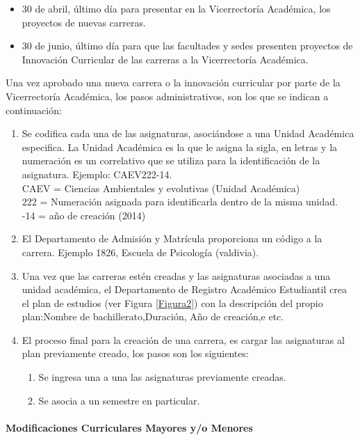 \documentclass[12pt]{article}
\newcommand{\myparagraph}[1]{\paragraph{#1}\mbox{}\\}
\begin{document}
			\begin{itemize}
				\item 30 de abril, último día para presentar en la Vicerrectoría Académica, los proyectos de nuevas carreras.
				\item 30 de junio, último día para que las facultades y sedes presenten proyectos de Innovación Curricular de las carreras a la Vicerrectoría Académica.
			\end{itemize}
			
			
			Una vez aprobado una nueva carrera o la innovación curricular por parte de la Vicerrectoría Académica, los pasos administrativos, son los que se indican a continuación:
		
			
			
			
			\begin{enumerate}
				
				
				\item Se codifica cada una de las asignaturas, asociándose a una Unidad Académica especifica. La Unidad Académica es la que le asigna la sigla, en letras y la numeración es un correlativo que se utiliza para la identificación de la asignatura. Ejemplo: CAEV222-14.
				\\
				CAEV = Ciencias Ambientales y evolutivas (Unidad Académica)
				\\
				222   = Numeración asignada para identificarla dentro de la misma unidad.
				\\
				-14    = año de creación (2014)
				
				\item El Departamento de Admisión y Matrícula proporciona  un código a la carrera. Ejemplo 1826, Escuela de Psicología (valdivia).
				
				\item Una vez que las carreras estén creadas y las asignaturas asociadas a una unidad académica, el Departamento de Registro Académico Estudiantil crea el plan de estudios (ver Figura \ref{Figura2}) con la descripción del propio plan:Nombre de bachillerato,Duración, Año de creación,e etc.
				
				\item El proceso final para la creación de una carrera, es cargar  las asignaturas al plan previamente creado, los pasos son los siguientes:
				\begin{enumerate}
					\item Se ingresa una a una las asignaturas previamente creadas.
					\item Se asocia a un semestre en particular.
				\end{enumerate}
			\end{enumerate}
			\newpage
			\myparagraph{Modificaciones Curriculares Mayores y/o Menores}
			
\end{document}
